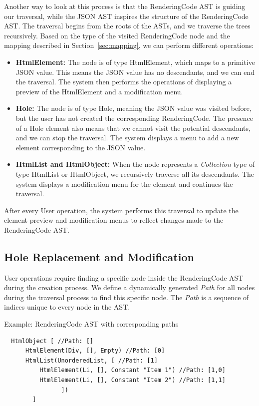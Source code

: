 Another way to look at this process is that the RenderingCode AST is guiding our traversal, while the JSON AST inspires the structure of the RenderingCode AST.
The traversal begins from the roots of the ASTs, and we traverse the trees recursively.
Based on the type of the visited RenderingCode node and the mapping described in Section~\ref{sec:mapping}, we can perform different operations:
\begin{itemize}
	\item \textbf{HtmlElement:} The node is of type HtmlElement, which maps to a primitive JSON value. This means the JSON value has no descendants, and we can end the traversal.
	      The system then performs the operations of displaying a preview of the HtmlElement and a modification menu.
	\item \textbf{Hole:} The node is of type Hole, meaning the JSON value was visited before, but the user has not created the corresponding RenderingCode.
	      The presence of a Hole element also means that we cannot visit the potential descendants, and we can stop the traversal.
	      The system displays a menu to add a new element corresponding to the JSON value.

	\item \textbf{HtmlList and HtmlObject:} When the node represents a \emph{Collection} type of type HtmlList or HtmlObject, we recursively traverse all its descendants.
	      The system displays a modification menu for the element and continues the traversal.
\end{itemize}

After every User operation, the system performs this traversal to update the element preview and modification menus to reflect changes made to the RenderingCode AST.


\subsection{Hole Replacement and Modification}

User operations require finding a specific node inside the RenderingCode AST during the creation process.
We define a dynamically generated \emph{Path} for all nodes during the traversal process to find this specific node.
The \emph{Path} is a sequence of indices unique to every node in the AST.

\begin{listing}[htbp]
	\caption {Example: RenderingCode AST with corresponding paths}
	\label{fig:paths}
	\begin{lstlisting}
  HtmlObject [ //Path: []
      HtmlElement(Div, [], Empty) //Path: [0]
      HtmlList(UnorderedList, [ //Path: [1]
          HtmlElement(Li, [], Constant "Item 1") //Path: [1,0]
          HtmlElement(Li, [], Constant "Item 2") //Path: [1,1]
				])
		]
  \end{lstlisting}
\end{listing}

